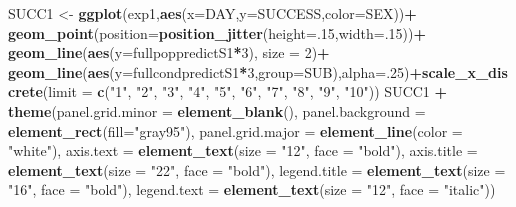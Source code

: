 \documentclass[]{article}
\newenvironment{Shaded}{\begin{snugshade}}{\end{snugshade}}
\newcommand{\KeywordTok}[1]{\textcolor[rgb]{0.13,0.29,0.53}{\textbf{#1}}}
\newcommand{\DataTypeTok}[1]{\textcolor[rgb]{0.13,0.29,0.53}{#1}}
\newcommand{\DecValTok}[1]{\textcolor[rgb]{0.00,0.00,0.81}{#1}}
\newcommand{\StringTok}[1]{\textcolor[rgb]{0.31,0.60,0.02}{#1}}
\newcommand{\OperatorTok}[1]{\textcolor[rgb]{0.81,0.36,0.00}{\textbf{#1}}}
\newcommand{\NormalTok}[1]{#1}
\begin{document}
\begin{Shaded}
\begin{Highlighting}[]
\NormalTok{SUCC1 <-}\StringTok{ }\KeywordTok{ggplot}\NormalTok{(exp1,}\KeywordTok{aes}\NormalTok{(}\DataTypeTok{x=}\NormalTok{DAY,}\DataTypeTok{y=}\NormalTok{SUCCESS,}\DataTypeTok{color=}\NormalTok{SEX))}\OperatorTok{+}
\StringTok{  }\KeywordTok{geom_point}\NormalTok{(}\DataTypeTok{position=}\KeywordTok{position_jitter}\NormalTok{(}\DataTypeTok{height=}\NormalTok{.}\DecValTok{15}\NormalTok{,}\DataTypeTok{width=}\NormalTok{.}\DecValTok{15}\NormalTok{))}\OperatorTok{+}
\StringTok{  }\KeywordTok{geom_line}\NormalTok{(}\KeywordTok{aes}\NormalTok{(}\DataTypeTok{y=}\NormalTok{fullpoppredictS1}\OperatorTok{*}\DecValTok{3}\NormalTok{), }\DataTypeTok{size =} \DecValTok{2}\NormalTok{)}\OperatorTok{+}
\StringTok{  }\KeywordTok{geom_line}\NormalTok{(}\KeywordTok{aes}\NormalTok{(}\DataTypeTok{y=}\NormalTok{fullcondpredictS1}\OperatorTok{*}\DecValTok{3}\NormalTok{,}\DataTypeTok{group=}\NormalTok{SUB),}\DataTypeTok{alpha=}\NormalTok{.}\DecValTok{25}\NormalTok{)}\OperatorTok{+}\KeywordTok{scale_x_discrete}\NormalTok{(}\DataTypeTok{limit =} \KeywordTok{c}\NormalTok{(}\StringTok{"1"}\NormalTok{, }\StringTok{"2"}\NormalTok{, }\StringTok{"3"}\NormalTok{, }\StringTok{"4"}\NormalTok{, }\StringTok{"5"}\NormalTok{, }\StringTok{"6"}\NormalTok{, }\StringTok{"7"}\NormalTok{, }\StringTok{"8"}\NormalTok{, }\StringTok{"9"}\NormalTok{, }\StringTok{"10"}\NormalTok{))}
\NormalTok{SUCC1 }\OperatorTok{+}\StringTok{ }\KeywordTok{theme}\NormalTok{(}\DataTypeTok{panel.grid.minor =} \KeywordTok{element_blank}\NormalTok{(), }\DataTypeTok{panel.background =} \KeywordTok{element_rect}\NormalTok{(}\DataTypeTok{fill=}\StringTok{"gray95"}\NormalTok{), }\DataTypeTok{panel.grid.major =} \KeywordTok{element_line}\NormalTok{(}\DataTypeTok{color =} \StringTok{"white"}\NormalTok{), }\DataTypeTok{axis.text =} \KeywordTok{element_text}\NormalTok{(}\DataTypeTok{size =} \StringTok{"12"}\NormalTok{, }\DataTypeTok{face =} \StringTok{"bold"}\NormalTok{), }\DataTypeTok{axis.title =} \KeywordTok{element_text}\NormalTok{(}\DataTypeTok{size =} \StringTok{"22"}\NormalTok{, }\DataTypeTok{face =} \StringTok{"bold"}\NormalTok{), }\DataTypeTok{legend.title =} \KeywordTok{element_text}\NormalTok{(}\DataTypeTok{size =} \StringTok{"16"}\NormalTok{, }\DataTypeTok{face =} \StringTok{"bold"}\NormalTok{), }\DataTypeTok{legend.text =} \KeywordTok{element_text}\NormalTok{(}\DataTypeTok{size =} \StringTok{"12"}\NormalTok{, }\DataTypeTok{face =} \StringTok{"italic"}\NormalTok{))}
\end{Highlighting}
\end{Shaded}
\end{document}
